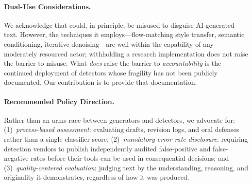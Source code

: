 \paragraph{Dual-Use Considerations.}
We acknowledge that \styleshield{} could, in principle, be misused to disguise AI-generated text.
However, the techniques it employs---flow-matching style transfer, semantic conditioning, iterative denoising---are well within the capability of any moderately resourced actor; withholding a research implementation does not raise the barrier to misuse.
What \emph{does} raise the barrier to \emph{accountability} is the continued deployment of detectors whose fragility has not been publicly documented.
Our contribution is to provide that documentation.

\paragraph{Recommended Policy Direction.}
Rather than an arms race between generators and detectors, we advocate for:
(1)~\emph{process-based assessment}: evaluating drafts, revision logs, and oral defenses rather than a single classifier score;
(2)~\emph{mandatory error-rate disclosure}: requiring detection vendors to publish independently audited false-positive and false-negative rates before their tools can be used in consequential decisions;
and (3)~\emph{quality-centered evaluation}: judging text by the understanding, reasoning, and originality it demonstrates, regardless of how it was produced.
